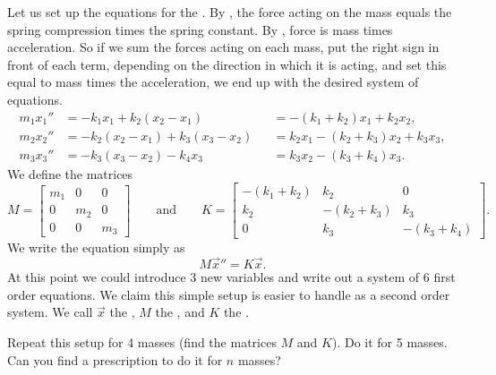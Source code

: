 \documentclass{ximera}
\begin{document}
Let us set up the equations for the . By , the force acting on the mass equals the spring compression times the spring constant.  By , force is mass times acceleration.  So if we sum the forces acting on each mass, put the right sign in front of each term, depending on the direction in which it is acting, and set this equal to mass times the acceleration, we end up with the desired system of equations.
\begin{equation*}
    \begin{aligned}
        m_1 x_1'' &= -k_1 x_1 + k_2 (x_2-x_1) & & = -(k_1+k_2) x_1 + k_2 x_2 , \\
        m_2 x_2'' &= -k_2 (x_2-x_1) + k_3 (x_3-x_2) & & = k_2 x_1 -(k_2+k_3) x_2 + k_3 x_3 , \\
        m_3 x_3'' &= -k_3 (x_3-x_2) - k_4 x_3 & & = k_3 x_2 - (k_3+k_4) x_3 . 
    \end{aligned}
\end{equation*}
We define the matrices
\begin{equation*}
    M =
    \begin{bmatrix}
        m_1 & 0 & 0 \\
        0 & m_2 & 0 \\
        0 & 0 & m_3
    \end{bmatrix}
    \qquad \text{and} \qquad K =
    \begin{bmatrix}
        -(k_1+k_2) & k_2 & 0 \\
        k_2 & -(k_2+k_3) & k_3 \\
        0 & k_3 & -(k_3+k_4)
    \end{bmatrix} .
\end{equation*}
We write the equation simply as
\begin{equation*}
    M {\vec{x}}'' = K \vec{x} .
\end{equation*}
At this point we could introduce 3 new variables and write out a system of 6 first order equations.  We claim this simple setup is easier to handle as a second order system. We call $\vec{x}$ the \emph{}, $M$ the \emph{}, and $K$ the \emph{}.

\begin{exercise}
    Repeat this setup for 4 masses (find the matrices $M$ and $K$). Do it for 5 masses.  Can you find a prescription to do it for $n$ masses?
\end{exercise}
\end{document}
